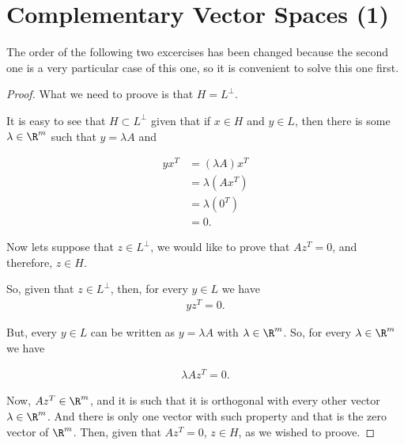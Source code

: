 ﻿\chapter{Complementary Vector Spaces (1)}
    The order of the following two excercises has been changed because the second one is
    a very particular case of this one, so it is convenient to solve this one first.

    
    \begin{proof}
        What we need to proove is that $H = L^\perp$.\pn
        
        It is easy to see that $H \subset L^\perp$ given that if $x \in H$ and $y \in L$, then
        there is some $\lambda \in \R^m$ such that $y = \lambda A$ and
        
        \begin{align}
                yx^T    &=  (\lambda A) x^T \\
                        &=  \lambda (A x^T) \\
                        &=  \lambda (0^T)   \\
                        &=  0.
        \end{align}\pn
        
        Now lets suppose that $z \in L^\perp$, we would like to prove that $A z^T = 0$, and therefore,
        $z \in H$.\pn
        
        So, given that $z \in L^\perp$, then, for every $y \in L$ we have
        \begin{align}
                    yz^T = 0.
        \end{align}\pn
        
        But, every $y \in L$ can be written as $y = \lambda A$ with $\lambda \in \R^m$. So, 
        for every $\lambda \in \R^m$ we have 
        
        \begin{align}
                \lambda A z^T   = 0.
        \end{align}
        
        Now, $A z^T \in \R^m$, and it is such that it is orthogonal with every other vector 
        $\lambda \in \R^m$. And there is only one vector with such property and that is the
        zero vector of $\R^m$. Then, given that $A z^T = 0$, $z \in H$, as we wished to proove.
    \end{proof}